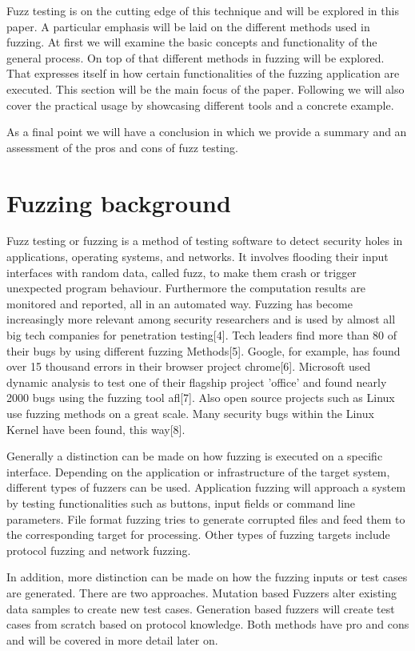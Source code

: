 \documentclass[journal=tosc,final]{iacrtrans}
\begin{document}
Fuzz testing is on the cutting edge of this technique and will be explored in this paper. A particular emphasis will be laid on the different methods used in fuzzing. 
At first we will examine the basic concepts and functionality of the general process. On top of that different methods in fuzzing will be explored. That expresses itself in how certain functionalities of the fuzzing application are executed. This section will be the main focus of the paper. Following we will also cover the practical usage by showcasing different tools and a concrete example. 

As a final point we will have a conclusion in which we provide a summary and an assessment of the pros and cons of fuzz testing. 
\newpage
\section{Fuzzing background}
Fuzz testing or fuzzing is a method of testing software to detect security holes in applications, operating systems, and networks. It involves flooding their input interfaces with random data, called fuzz, to make them crash or trigger unexpected program behaviour. Furthermore the computation results are monitored and reported, all in an automated way. Fuzzing has become increasingly more relevant among security researchers and is used by almost all big tech companies for penetration testing[4]. Tech leaders find more than 80 of their bugs by using different fuzzing Methods[5]. Google, for example, has found over 15 thousand errors in their browser project chrome[6]. Microsoft used dynamic analysis to test one of their flagship project 'office' and found nearly 2000 bugs using the fuzzing tool afl[7]. Also open source projects such as Linux use fuzzing methods on a great scale. Many security bugs within the Linux Kernel have been found, this way[8].

Generally a distinction can be made on how fuzzing is executed on a specific interface. Depending on the application or infrastructure of the target system, different types of fuzzers can be used. Application fuzzing will approach a system by testing functionalities such as buttons, input fields or command line parameters. File format fuzzing tries to generate corrupted files and feed them to the corresponding target for processing. Other types of fuzzing targets include protocol fuzzing and network fuzzing.

In addition, more distinction can be made on how the fuzzing inputs or test cases are generated. There are two approaches. Mutation based Fuzzers alter existing data samples to create new test cases.
Generation based fuzzers will create test cases from scratch based on protocol knowledge. 
Both methods have pro and cons and will be covered in more detail later on.
\end{document}
